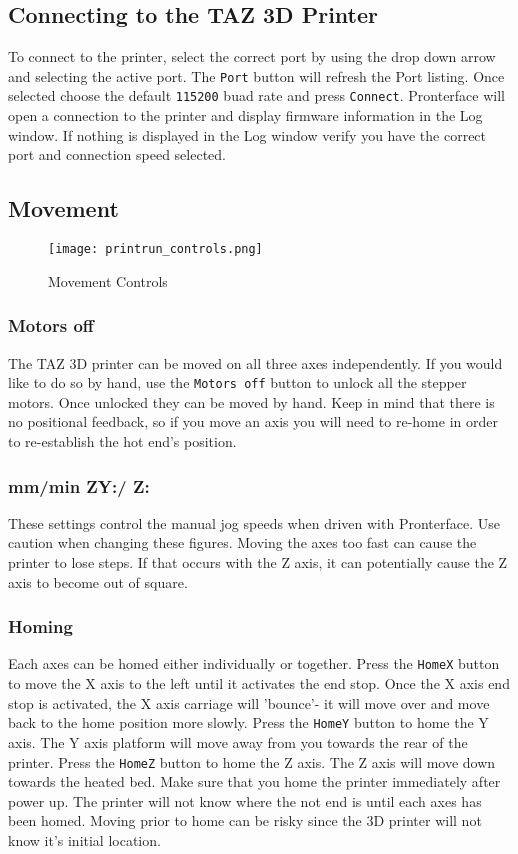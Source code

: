 \begin{enumerate}
\subsection{Connecting to the TAZ 3D Printer}
To connect to the printer, select the correct port by using the drop down arrow and selecting the active port. The \texttt{Port} button will refresh the Port listing. Once selected choose the default \texttt{115200} buad rate and press \texttt{Connect}. Pronterface will open a connection to the printer and display firmware information in the Log window. If nothing is displayed in the Log window verify you have the correct port and connection speed selected. 

\subsection{Movement} 
\begin{figure}[H]
\centering
\texttt{[image: printrun\_controls.png]}
\caption{Movement Controls}
\label{fig:printrun_controls}
\end{figure}

\subsubsection{Motors off}
The TAZ 3D printer can be moved on all three axes independently. If you would like to do so by hand, use the \texttt{Motors off} button to unlock all the stepper motors. Once unlocked they can be moved by hand. Keep in mind that there is no positional feedback, so if you move an axis you will need to re-home in order to re-establish the hot end's position. 

\subsubsection{mm/min ZY:/ Z:}
These settings control the manual jog speeds when driven with Pronterface. Use caution when changing these figures. Moving the axes too fast can cause the printer to lose steps. If that occurs with the Z axis, it can potentially cause the Z axis to become out of square.

\subsubsection{Homing}
Each axes can be homed either individually or together. Press the \texttt{HomeX} button to move the X axis to the left until it activates the end stop. Once the X axis end stop is activated, the X axis carriage will 'bounce'- it will move over and move back to the home position more slowly. Press the \texttt{HomeY} button to home the Y axis. The Y axis platform will move away from you towards the rear of the printer. Press the \texttt{HomeZ} button to home the Z axis. The Z axis will move down towards the heated bed. Make sure that you home the printer immediately after power up. The printer will not know where the not end is until each axes has been homed. Moving prior to home can be risky since the 3D printer will not know it's initial location.  


\end{enumerate}
